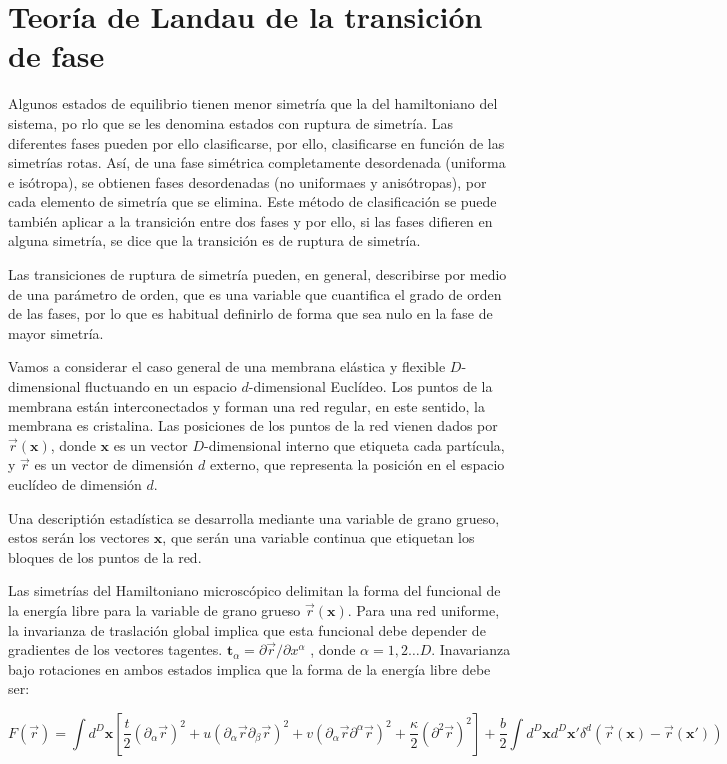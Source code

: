 \section{Teoría de Landau de la transición de fase}

Algunos estados de equilibrio tienen menor simetría que la del hamiltoniano
del sistema, po rlo que se les denomina estados con ruptura de simetría. Las
diferentes fases pueden por ello clasificarse, por ello, clasificarse en
función de las simetrías rotas. Así, de una fase simétrica completamente
desordenada (uniforma e isótropa), se obtienen fases desordenadas (no
uniformaes y anisótropas), por cada elemento de simetría que se elimina.
Este método de clasificación se puede también aplicar a la transición entre
dos fases y por ello, si las fases difieren en alguna simetría, se dice que la
transición es de ruptura de simetría.

Las transiciones de ruptura de simetría pueden, en general, describirse por
medio de una parámetro de orden, que es una variable que cuantifica el grado
de orden de las fases, por lo que es habitual definirlo de forma que sea nulo
en la fase de mayor simetría.

Vamos a considerar el caso general de una membrana elástica y flexible
$D$-dimensional fluctuando en un espacio $d$-dimensional Euclídeo. Los puntos
de la membrana están interconectados y forman una red regular, en este
sentido, la membrana es cristalina. 
Las posiciones de los puntos de la red vienen dados por $\vec{r}(\mathbf{x})$,
donde $\mathbf{x}$ es un vector $D$-dimensional interno que etiqueta cada
partícula, y $\vec{r}$ es un vector de dimensión $d$ externo, que representa
la posición en el espacio euclídeo de dimensión $d$. 

Una descriptión estadística se desarrolla mediante una variable de grano
grueso, estos serán los vectores $\mathbf{x}$, que serán una variable continua
que etiquetan los bloques de los puntos de la red. 

Las simetrías del Hamiltoniano microscópico delimitan la forma del funcional
de la energía libre para la variable de grano grueso $\vec{r}(\mathbf{x})$. Para una red
uniforme, la invarianza de traslación global implica que esta funcional debe
depender de gradientes de los vectores tagentes.
$\mathbf{t}_{\alpha}=\partial \vec{r}/\partial x^{\alpha} $ , donde
$\alpha=1,2\dots D$. Inavarianza bajo rotaciones en ambos estados implica que
la forma de la energía libre debe ser:

\begin{equation}
F(\vec{r})=\int d^D\mathbf{x}
\left[
\frac{t}{2}(\partial_{\alpha}\vec{r})^2+
u(\partial_{\alpha}\vec{r}\partial_{\beta}\vec{r})^2+
v(\partial_{\alpha}\vec{r}\partial^{\alpha}\vec{r})^2+
\frac{\kappa}{2}(\partial^2\vec{r})^2
\right]
+\frac{b}{2}\int d^D\mathbf{x} d^D\mathbf{x'}
\delta^{d}(\vec{r}(\mathbf{x})-\vec{r}(\mathbf{x'}))
\end{equation}

